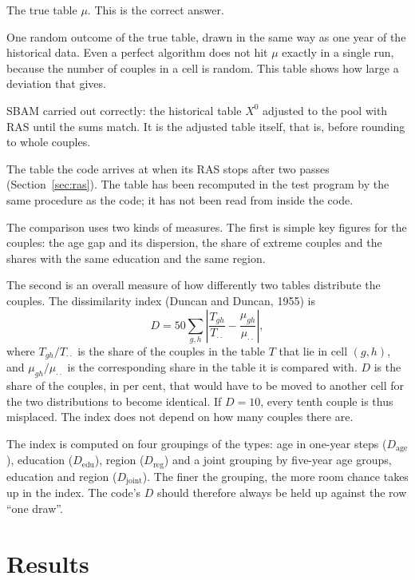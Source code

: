 \documentclass[12pt,a4paper]{article}
\begin{document}
\begin{description}[leftmargin=1.5em, style=nextline]
\item[True model] The true table $\mu$. This is the correct answer.
\item[True model, one draw] One random outcome of the true table, drawn in the same way as one year
of the historical data. Even a perfect algorithm does not hit $\mu$ exactly in a single run,
because the number of couples in a cell is random. This table shows how large a deviation that
gives.
\item[Reference SBAM] SBAM carried out correctly: the historical table $X^0$ adjusted to the pool
with RAS until the sums match. It is the adjusted table itself, that is, before rounding to whole
couples.
\item[The code's RAS table] The table the code arrives at when its RAS stops after two passes
(Section~\ref{sec:ras}). The table has been recomputed in the test program by the same procedure as
the code; it has not been read from inside the code.
\end{description}

The comparison uses two kinds of measures. The first is simple key figures for the couples: the age
gap and its dispersion, the share of extreme couples and the shares with the same education and the
same region.

The second is an overall measure of how differently two tables distribute the couples. The
dissimilarity index (Duncan and Duncan, 1955) is
\[
D=50\sum_{g,h}\left|\frac{T_{gh}}{T_{\cdot\cdot}}-\frac{\mu_{gh}}{\mu_{\cdot\cdot}}\right| ,
\]
where $T_{gh}/T_{\cdot\cdot}$ is the share of the couples in the table $T$ that lie in cell
$(g,h)$, and $\mu_{gh}/\mu_{\cdot\cdot}$ is the corresponding share in the table it is compared
with. $D$ is the share of the couples, in per cent, that would have to be moved to another cell for
the two distributions to become identical. If $D=10$, every tenth couple is thus misplaced. The
index does not depend on how many couples there are.

The index is computed on four groupings of the types: age in one-year steps ($D_{\text{age}}$),
education ($D_{\text{edu}}$), region ($D_{\text{reg}}$) and a joint grouping by five-year age
groups, education and region ($D_{\text{joint}}$). The finer the grouping, the more room chance
takes up in the index. The code's $D$ should therefore always be held up against the row ``one
draw''.


\section{Results}\label{sec:resultater}
\end{document}
